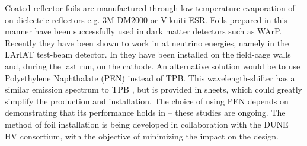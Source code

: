Coated reflector foils are manufactured through low-temperature evaporation of  on dielectric reflectors e.g. 3M DM2000 or Vikuiti  ESR. Foils prepared in this manner have been successfully used in dark matter detectors such as WArP\cite{Acciarri:2008kv}. Recently they have been shown to work in  at neutrino energies, namely  in the LArIAT test-beam detector\cite{Garcia-Gamez:2017cmu}. In  they have been installed on the field-cage walls and, during the last run, on the cathode. An alternative solution would be to use Polyethylene Naphthalate (PEN) instead of TPB. This wavelength-shifter has a similar emission spectrum to TPB \cite{Kuzniak:2018dcf}, but is provided in sheets, which could greatly simplify the production and installation. The choice of using PEN depends on demonstrating that its performance holds in \lar -- these studies are ongoing. 
The method of foil installation is being developed in collaboration with the DUNE HV consortium, with the objective of minimizing the impact on the  design. 



